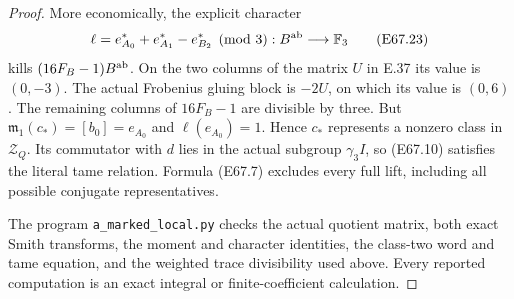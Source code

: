 \begin{proof}
More economically, the explicit character
\[
 \ell=e_{A_0}^*+e_{A_1}^*-e_{B_2}^*\pmod3
       :B^{\rm ab}\longrightarrow\mathbb F_3
 \tag{E67.23}
\]
kills $(16F_B-1)B^{\rm ab}$. On the two columns
of the matrix $U$ in E.37 its value is $(0,-3)$.
The actual Frobenius gluing block is $-2U$, on which
its value is $(0,6)$. The remaining columns of
$16F_B-1$ are divisible by three. But
$\mathfrak m_1(c_*)=[b_0]=e_{A_0}$ and
$\ell(e_{A_0})=1$. Hence $c_*$ represents a
nonzero class in $\mathcal Z_Q$.
Its commutator with $d$ lies in the actual subgroup
$\gamma_3I$, so (E67.10) satisfies the literal tame
relation. Formula (E67.7) excludes every full lift,
including all possible conjugate representatives.

The program \texttt{a\_marked\_local.py} checks the
actual quotient matrix, both exact Smith transforms,
the moment and character identities, the class-two
word and tame equation, and the weighted trace
divisibility used above. Every reported computation
is an exact integral or finite-coefficient calculation.
\end{proof}
